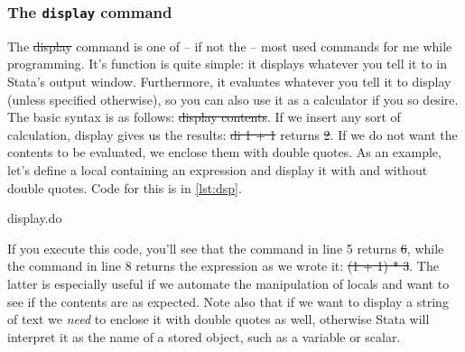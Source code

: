 \subsubsection{The \texttt{display} command}
The \st{display} command is one of -- if not the -- most used commands for me while programming.
It's function is quite simple: it displays whatever you tell it to in Stata's output window.
Furthermore, it evaluates whatever you tell it to display (unless specified otherwise),
so you can also use it as a calculator if you so desire.
The basic syntax is as follows: \st{display contents}.
If we insert any sort of calculation, display gives us the results:
\st{di 1 + 1} returns \st{2}.
If we do not want the contents to be evaluated, we enclose them with double quotes.
As an example,
let's define a local containing an expression and display it with and without double quotes.
Code for this is in \cref{lst:dsp}.

\begin{listing}[tbp]
\caption{display.do}\label{lst:dsp}
\end{listing}

If you execute this code, you'll see that the command in line 5 returns \st{6},
while the command in line 8 returns the expression as we wrote it:
\st{(1 + 1) * 3}.
The latter is especially useful if we automate the manipulation of locals and want to see if the contents are as expected.
Note also that if we want to display a string of text we \emph{need} to enclose it with double quotes as well,
otherwise Stata will interpret it as the name of a stored object,
such as a variable or scalar.

